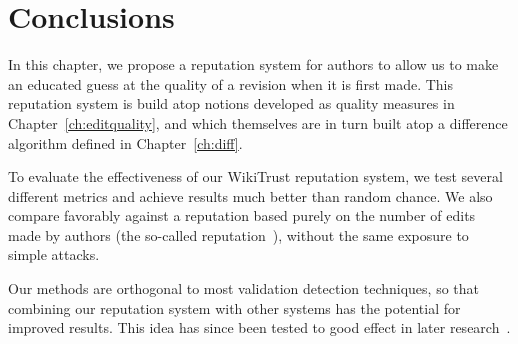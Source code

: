 \section{Conclusions}

In this chapter, we propose a reputation system for authors to allow us
to make an educated guess at the quality of a revision when it is first
made.
This reputation system is build atop notions developed as quality
measures in Chapter~\ref{ch:editquality}, and which themselves are
in turn built atop a difference algorithm defined in Chapter~\ref{ch:diff}.

To evaluate the effectiveness of our WikiTrust reputation system, we
test several different metrics and achieve results much better than
random chance.
We also compare favorably against a reputation based purely on the
number of edits made by authors (the so-called 
reputation~\cite{Cross2006}), without the same exposure to simple
attacks.

Our methods are orthogonal to most validation detection techniques, so
that combining our reputation system with other systems has the
potential for improved results.
This idea has since been tested to good effect in later
research~\cite{Adler2011}.

